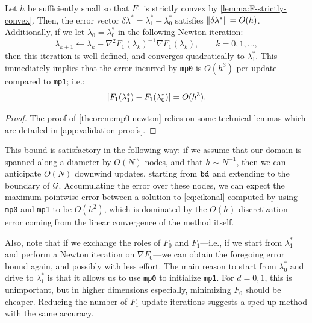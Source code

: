 \documentclass[sisc-eikonal.tex]{subfiles}
\begin{document}
\begin{theorem}\label{theorem:mp0-newton}
  Let $h$ be sufficiently small so that $F_1$ is strictly convex by
  \cref{lemma:F-strictly-convex}. Then, the error vector
  $\delta\lambda^* = \lambda_1^* - \lambda_0^*$ satisfies
  $\left\|\delta\lambda^*\right\| = O(h)$. Additionally, if we let
  $\lambda_0 = \lambda_0^*$ in the following Newton iteration:
  \begin{equation}
    \label{eq:lam0-iter-to-lam1}
    \lambda_{k+1} \gets \lambda_k - \nabla^2 F_1(\lambda_k)^{-1} \nabla F_1(\lambda_k), \qquad k = 0, 1, \hdots,
  \end{equation}
  then this iteration is well-defined, and converges quadratically to
  $\lambda_1^*$. This immediately implies that the error incurred by
  \texttt{mp0} is $O(h^3)$ per update compared to \texttt{mp1}; i.e.:
  \begin{equation}
    \label{eq:mp0-error}
    \abs{F_1(\lambda_1^*) - F_1(\lambda_0^*)} = O(h^3).
  \end{equation}
\end{theorem}

\begin{proof}
  The proof of \cref{theorem:mp0-newton} relies on some technical
  lemmas which are detailed in \cref{app:validation-proofs}.
\end{proof}

This bound is satisfactory in the following way: if we assume that our
domain is spanned along a diameter by $O(N)$ nodes, and that
$h \sim N^{-1}$, then we can anticipate $O(N)$ downwind updates,
starting from $\texttt{bd}$ and extending to the boundary of
$\mathcal{G}$. Accumulating the error over these nodes, we can expect the
maximum pointwise error between a solution to \cref{eq:eikonal}
computed by using \texttt{mp0} and \texttt{mp1} to be $O(h^2)$, which
is dominated by the $O(h)$ discretization error coming from the linear
convergence of the method itself.

Also, note that if we exchange the roles of $F_0$ and $F_1$---i.e., if
we start from $\lambda_1^*$ and perform a Newton iteration on
$\nabla F_0$---we can obtain the foregoing error bound again, and
possibly with less effort. The main reason to start from $\lambda_0^*$
and drive to $\lambda_1^*$ is that it allows us to use \texttt{mp0} to
initialize \texttt{mp1}. For $d = 0, 1$, this is unimportant, but in
higher dimensions especially, minimizing $F_0$ should be
cheaper. Reducing the number of $F_1$ update iterations suggests a
sped-up method with the same accuracy.
\end{document}
